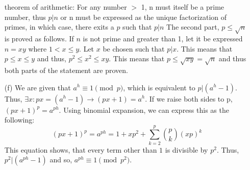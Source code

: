 \documentclass[11pt]{article}
\begin{document}
\begin{itemize}
    theorem of arithmetic:
    For any number $>$ 1, n must itself be a prime number, thus $p|n$ or n must be expressed
    as the unique factorization of primes, in which case, there exits a $p$ such that $p|n$
    The second part, $p \leq \sqrt{n}$ is proved as follows. If $n$ is not prime and greater
    than 1, let it be expressed $n = xy$ where $1 < x \leq y$. Let $x$ be chosen such that 
    $p | x$. This means that $p \leq x \leq y$ and thus, $p^{2} \leq x^{2}\leq xy$.
    This means that $p \leq \sqrt{xy} = \sqrt{n}$ and thus both parts of the 
    statement are proven.
  \item[(f)] 
    We are given that $a^{h} \equiv 1 \pmod{p}$, which is equivalent to $p | (a^{h} -1)$.
    Thus, $\exists x: px = (a^{h} - 1) \rightarrow (px+1) = a^{h}$. If we raise both sides to 
    p, $(px+1)^{p} = a^{ph}$. Using binomial expansion, we can express this as the following:
    \[
      (px+1)^{p} = a^{ph} = 1 + xp^{2} + \sum_{k=2}^{p} \binom{p}{k} (xp)^{k}
    \]
    This equation shows, that every term other than $1$ is divisible by $p^{2}$. Thus, 
    $ p^{2} | (a^{ph} -1)$ and so, $a^{ph} \equiv 1 \pmod{p^{2}}$.
\end{itemize}
\end{document}
